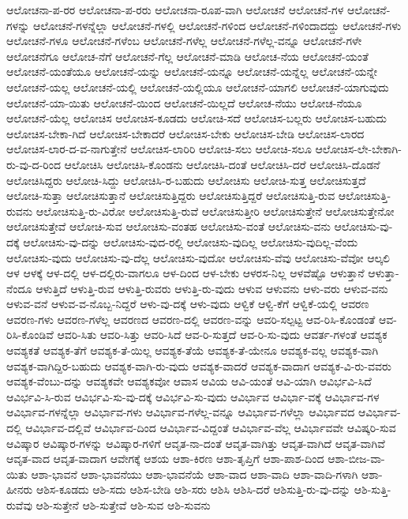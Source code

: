 {ಆಲೋಚನಾ-ಪ-ರರ
ಆಲೋಚನಾ-ಪ-ರರು
ಆಲೋಚನಾ-ರೂಪ-ವಾಗಿ
ಆಲೋಚನೆ
ಆಲೋಚನೆ-ಗಳ
ಆಲೋಚನೆ-ಗಳನ್ನು
ಆಲೋಚನೆ-ಗಳನ್ನೆಲ್ಲಾ
ಆಲೋಚನೆ-ಗಳಲ್ಲಿ
ಆಲೋಚನೆ-ಗಳಿಂದ
ಆಲೋಚನೆ-ಗಳಿಂದಾದದ್ದು
ಆಲೋಚನೆ-ಗಳು
ಆಲೋಚನೆ-ಗಳೂ
ಆಲೋಚನೆ-ಗಳೆಂಬ
ಆಲೋಚನೆ-ಗಳೆಲ್ಲ
ಆಲೋಚನೆ-ಗಳೆಲ್ಲ-ವನ್ನೂ
ಆಲೋಚನೆ-ಗಳೇ
ಆಲೋಚನೆಗೂ
ಆಲೋಚ-ನೆಗೆ
ಆಲೋಚನೆ-ಗೆಲ್ಲ
ಆಲೋಚನೆ-ಮಾಡಿ
ಆಲೋಚ-ನೆಯ
ಆಲೋಚನೆ-ಯಂತೆ
ಆಲೋಚನೆ-ಯಂತೆಯೂ
ಆಲೋಚನೆ-ಯನ್ನು
ಆಲೋಚನೆ-ಯನ್ನೂ
ಆಲೋಚನೆ-ಯನ್ನೆಲ್ಲ
ಆಲೋಚನೆ-ಯನ್ನೇ
ಆಲೋಚನೆ-ಯಲ್ಲ
ಆಲೋಚನೆ-ಯಲ್ಲಿ
ಆಲೋಚನೆ-ಯಲ್ಲಿಯೂ
ಆಲೋಚನೆ-ಯಾಗಲಿ
ಆಲೋಚನೆ-ಯಾಗುವುದು
ಆಲೋಚನೆ-ಯಾ-ಯಿತು
ಆಲೋಚನೆ-ಯಿಂದ
ಆಲೋಚನೆ-ಯಿಲ್ಲದೆ
ಆಲೋಚ-ನೆಯು
ಆಲೋಚ-ನೆಯೂ
ಆಲೋಚನೆ-ಯೆಲ್ಲ
ಆಲೋಚಿಸ
ಆಲೋಚಿಸ-ಕೂಡದು
ಆಲೋಚಿ-ಸದೆ
ಆಲೋಚಿಸ-ಬಲ್ಲರು
ಆಲೋಚಿಸ-ಬಹುದು
ಆಲೋಚಿಸ-ಬೇಕಾ-ಗಿದೆ
ಆಲೋಚಿಸ-ಬೇಕಾದರೆ
ಆಲೋಚಿಸ-ಬೇಕು
ಆಲೋಚಿಸ-ಬೇಡಿ
ಆಲೋಚಿಸ-ಲಾರದ
ಆಲೋಚಿಸ-ಲಾರ-ದ-ವ-ನಾಗುತ್ತೇನೆ
ಆಲೋಚಿಸ-ಲಾರಿರಿ
ಆಲೋಚಿ-ಸಲು
ಆಲೋಚಿ-ಸಲೂ
ಆಲೋಚಿಸ-ಲೇ-ಬೇಕಾಗಿ-ರು-ವು-ದ-ರಿಂದ
ಆಲೋಚಿಸಿ
ಆಲೋಚಿಸಿ-ಕೊಂಡನು
ಆಲೋಚಿಸಿ-ದಂತೆ
ಆಲೋಚಿಸಿ-ದರೆ
ಆಲೋಚಿಸಿ-ದೊಡನೆ
ಆಲೋಚಿಸಿದ್ದರು
ಆಲೋಚಿ-ಸಿದ್ದು
ಆಲೋಚಿಸಿ-ರ-ಬಹುದು
ಆಲೋಚಿಸು
ಆಲೋಚಿ-ಸುತ್ತ
ಆಲೋಚಿಸುತ್ತದೆ
ಆಲೋಚಿ-ಸುತ್ತಾ
ಆಲೋಚಿಸುತ್ತಾನೆ
ಆಲೋಚಿಸುತ್ತಿದ್ದರು
ಆಲೋಚಿಸುತ್ತಿದ್ದರೆ
ಆಲೋಚಿಸುತ್ತಿ-ರುವ
ಆಲೋಚಿಸುತ್ತಿ-ರುವನು
ಆಲೋಚಿಸುತ್ತಿ-ರು-ವಿರೋ
ಆಲೋಚಿಸುತ್ತಿ-ರುವೆ
ಆಲೋಚಿಸುತ್ತೀರಿ
ಆಲೋಚಿಸುತ್ತೇನೆ
ಆಲೋಚಿಸುತ್ತೇನೋ
ಆಲೋಚಿಸುತ್ತೇವೆ
ಆಲೋಚಿ-ಸುವ
ಆಲೋಚಿಸು-ವಂತಹ
ಆಲೋಚಿಸು-ವಂತೆ
ಆಲೋಚಿಸು-ವನು
ಆಲೋಚಿಸು-ವು-ದಕ್ಕೆ
ಆಲೋಚಿಸು-ವು-ದನ್ನು
ಆಲೋಚಿಸು-ವುದ-ರಲ್ಲಿ
ಆಲೋಚಿಸು-ವುದಿಲ್ಲ
ಆಲೋಚಿಸು-ವುದಿಲ್ಲ-ವೆಂದು
ಆಲೋಚಿಸು-ವುದು
ಆಲೋಚಿಸು-ವು-ದೆಲ್ಲ
ಆಲೋಚಿಸು-ವುದೋ
ಆಲೋಚಿಸು-ವೆವು
ಆಲೋಚಿಸು-ವೆವೋ
ಆಲ್ಕಲಿ
ಆಳ
ಆಳಕ್ಕೆ
ಆಳ-ದಲ್ಲಿ
ಆಳ-ದಲ್ಲಿರು-ವಾಗಲೂ
ಆಳ-ದಿಂದ
ಆಳ-ಬೇಕು
ಆಳರಸ-ನಿಲ್ಲ
ಆಳವೆಷ್ಟೊ
ಆಳುತ್ತಾನೆ
ಆಳುತ್ತಾ-ನೆಂದೂ
ಆಳುತ್ತಿದೆ
ಆಳುತ್ತಿ-ರುವ
ಆಳುತ್ತಿ-ರುವರು
ಆಳುತ್ತಿ-ರು-ವುದು
ಆಳುವ
ಆಳುವನು
ಆಳು-ವರು
ಆಳುವ-ವನು
ಆಳುವ-ವನೆ
ಆಳುವ-ವ-ನೊಬ್ಬ-ನಿದ್ದರೆ
ಆಳು-ವು-ದಕ್ಕೆ
ಆಳು-ವುದು
ಆಳ್ವಿಕೆ
ಆಳ್ವಿ-ಕೆಗೆ
ಆಳ್ವಿಕೆ-ಯಲ್ಲಿ
ಆವರಣ
ಆವರಣ-ಗಳು
ಆವರಣ-ಗಳೆಲ್ಲ
ಆವರಣದ
ಆವರಣ-ದಲ್ಲಿ
ಆವರಣ-ವನ್ನು
ಆವರಿ-ಸಲ್ಪಟ್ಟ
ಆವ-ರಿಸಿ-ಕೊಂಡಂತೆ
ಆವ-ರಿಸಿ-ಕೊಂಡಿವೆ
ಆವರಿ-ಸಿತು
ಆವರಿ-ಸಿತ್ತು
ಆವರಿ-ಸಿದೆ
ಆವ-ರಿ-ಸುತ್ತದೆ
ಆವ-ರಿ-ಸು-ವುದು
ಆವರ್ತ-ಗಳಂತೆ
ಆವಶ್ಯಕ
ಆವಶ್ಯಕತೆ
ಆವಶ್ಯಕ-ತೆಗೆ
ಆವಶ್ಯಕ-ತೆ-ಯಿಲ್ಲ
ಆವಶ್ಯಕ-ತೆಯೆ
ಆವಶ್ಯಕ-ತೆ-ಯೇನೂ
ಆವಶ್ಯಕ-ವಲ್ಲ
ಆವಶ್ಯಕ-ವಾಗಿ
ಆವಶ್ಯಕ-ವಾಗಿದ್ದಿರ-ಬಹುದು
ಆವಶ್ಯಕ-ವಾಗಿ-ರು-ವುದು
ಆವಶ್ಯಕ-ವಾದರೆ
ಆವಶ್ಯಕ-ವಾದಾಗ
ಆವಶ್ಯಕ-ವಿ-ರು-ವವರು
ಆವಶ್ಯಕ-ವೆಂಬು-ದನ್ನು
ಆವಶ್ಯಕವೇ
ಆವಶ್ಯಕವೋ
ಆವಾಸ
ಆವಿಯ
ಆವಿ-ಯಂತೆ
ಆವಿ-ಯಾಗಿ
ಆವಿರ್ಭವಿ-ಸಿದೆ
ಆವಿರ್ಭವಿ-ಸಿ-ರುವ
ಆವಿರ್ಭವಿ-ಸು-ವು-ದಕ್ಕೆ
ಆವಿರ್ಭವಿ-ಸು-ವುದು
ಆವಿರ್ಭಾವ
ಆವಿರ್ಭಾ-ವಕ್ಕೆ
ಆವಿರ್ಭಾವ-ಗಳ
ಆವಿರ್ಭಾವ-ಗಳನ್ನೆಲ್ಲಾ
ಆವಿರ್ಭಾವ-ಗಳು
ಆವಿರ್ಭಾವ-ಗಳೆಲ್ಲ-ವನ್ನೂ
ಆವಿರ್ಭಾವ-ಗಳೆಲ್ಲಾ
ಆವಿರ್ಭಾವದ
ಆವಿರ್ಭಾವ-ದಲ್ಲಿ
ಆವಿರ್ಭಾವ-ದಲ್ಲಿವೆ
ಆವಿರ್ಭಾವ-ದಿಂದ
ಆವಿರ್ಭಾವ-ವಿದ್ದಂತೆ
ಆವಿರ್ಭಾವ-ವೆಲ್ಲ
ಆವಿರ್ಭಾವವೇ
ಆವಿಷ್ಕರಿ-ಸುವ
ಆವಿಷ್ಕಾರ
ಆವಿಷ್ಕಾರ-ಗಳನ್ನು
ಆವಿಷ್ಕಾರ-ಗಳಿಗೆ
ಆವೃತ-ನಾ-ದಂತೆ
ಆವೃತ-ವಾಗಿತ್ತು
ಆವೃತ-ವಾಗಿದೆ
ಆವೃತ-ವಾಗಿವೆ
ಆವೃತ-ವಾದ
ಆವೃತ-ವಾದಾಗ
ಆವೇಗಕ್ಕೆ
ಆಶಯ
ಆಶಾ-ಕಿರಣ
ಆಶಾ-ತೃಪ್ತಿಗೆ
ಆಶಾ-ಪಾಶ-ದಿಂದ
ಆಶಾ-ಬೀಜ-ವಾ-ಯಿತು
ಆಶಾ-ಭಾವನೆ
ಆಶಾ-ಭಾವನೆಯು
ಆಶಾ-ಭಾವನೆಯೆ
ಆಶಾ-ವಾದ
ಆಶಾ-ವಾದಿ
ಆಶಾ-ವಾದಿ-ಗಳಾಗಿ
ಆಶಾ-ಹೀನರು
ಆಶಿಸ-ಕೂಡದು
ಆಶಿ-ಸದು
ಆಶಿಸ-ಬೇಡಿ
ಆಶಿ-ಸರು
ಆಶಿಸಿ
ಆಶಿಸಿ-ದರೆ
ಆಶಿಸುತ್ತಿ-ರು-ವು-ದನ್ನು
ಆಶಿ-ಸುತ್ತಿ-ರುವೆವು
ಆಶಿ-ಸುತ್ತೇನೆ
ಆಶಿ-ಸುತ್ತೇವೆ
ಆಶಿ-ಸುವ
ಆಶಿ-ಸುವನು
}
